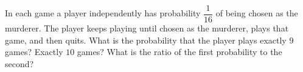 In each game a player independently has probability $\dfrac1{16}$ of being chosen as the murderer. The player keeps playing until chosen as the murderer, plays that game, and then quits. What is the probability that the player plays exactly $9$ games? Exactly $10$ games? What is the ratio of the first probability to the second?
